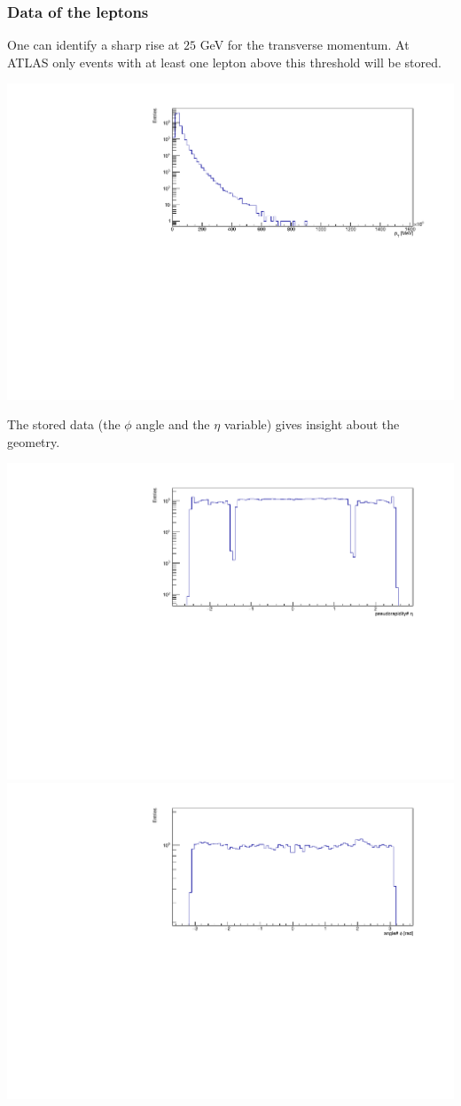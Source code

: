 \documentclass[12pt, a4paper, bibliography=totoc]{scrartcl}
\begin{document}
\begin{multicols}{2}
\subsubsection{Data of the leptons}
One can identify a sharp rise at $25$ \si{GeV} for the transverse momentum. At ATLAS only events with at least one lepton above this threshold will be stored.
\begin{center}
    \includegraphics[width=0.8\linewidth]{fig/p_T_final.pdf}
\end{center}    
The stored data (the $\phi$ angle and the $\eta$ variable) gives insight about the geometry.
\begin{center}
    \includegraphics[width=0.8\linewidth]{fig/eta_final.pdf}
    \includegraphics[width=0.8\linewidth]{fig/phi_final.pdf}

\end{center}
\end{multicols}
\end{document}
